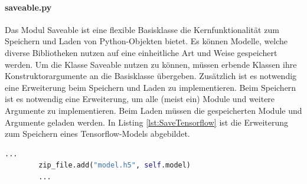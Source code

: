 	 \paragraph{saveable.py} Das Modul Saveable ist eine flexible Basisklasse die Kernfunktionalität zum Speichern und Laden von Python-Objekten bietet. Es können Modelle, welche diverse Bibliotheken nutzen auf eine einheitliche Art und Weise gespeichert werden. Um die Klasse Saveable nutzen zu können, müssen erbende Klassen ihre Konstruktorargumente an die Basisklasse übergeben. Zusätzlich ist es notwendig eine Erweiterung beim Speichern und Laden zu implementieren. Beim Speichern ist es notwendig eine Erweiterung, um alle (meist ein) Module und weitere Argumente zu implementieren. Beim Laden müssen die gespeicherten Module und Argumente geladen werden. In Listing \ref{lst:SaveTensorflow} ist die Erweiterung zum Speichern eines Tensorflow-Models abgebildet. 
	\begin{lstlisting}[language=python,caption=Erweiterung zum Speichern eines Tensorflow Models, label=lst:SaveTensorflow]
		...
		zip_file.add("model.h5", self.model)
		...
	\end{lstlisting}

